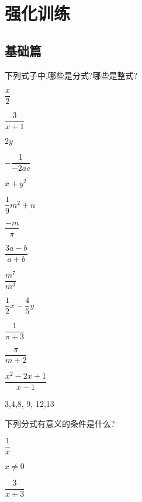 \documentclass[cn,blue,12pt]{elegantbook}
\begin{document}
\section{强化训练}%
\label{sec:强化训练}

\subsection{基础篇}%
\begin{xiti}[resume]
\item 下列式子中,哪些是分式\(?\)哪些是整式\(?\)
    \begin{multicols}{3}
        \begin{xiti}
            \setlength{\itemsep}{1.5ex}
        \item \(\dfrac{x}{2}\)
        \item \(\dfrac{3}{x+1}\)
        \item \(2y\)
        \item \(-\dfrac{1}{-2ac}\)
        \item \(x+y^2\)
        \item \(\dfrac{1}{9}m^2+n\)
        \item \(\dfrac{-m}{\pi }\)
        \item \(\dfrac{3a-b}{a+b}\)
        \item \(\dfrac{m^7}{m^3}\)
        \item \(\dfrac{1}{2}x-\dfrac{4}{5}y\)
        \item \(\dfrac{1}{\pi +3}\)
        \item \(\dfrac{\pi}{m+2}\)
        \item \(\dfrac{x^2-2x+1}{x-1}\)
        \end{xiti}
    \end{multicols}
\begin{solution}
        3,4,8, 9, 12,13\\
\end{solution}
\item 下列分式有意义的条件是什么?
    \begin{multicols}{2}
        \begin{xiti}
            \setlength{\itemsep}{1.5ex}
        \item \(\dfrac{1}{x}\)
\begin{solution}
                \(x \ne 0\)\\
\end{solution}
        \item \(\dfrac{3}{x+3}\)
\begin{solution}

\end{solution}
\end{xiti}
\end{multicols}
\end{xiti}
\end{document}
